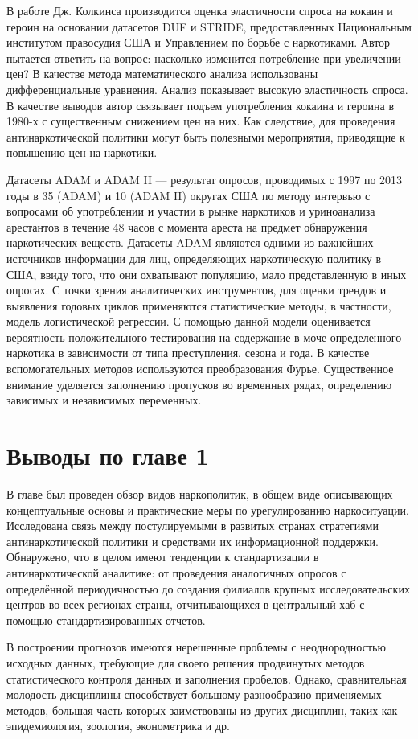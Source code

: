 В работе Дж. Колкинса \cite{Caulkins1995} производится оценка эластичности спроса 
на кокаин и героин на основании датасетов DUF и STRIDE, предоставленных
Национальным институтом правосудия США и Управлением по борьбе с наркотиками.
Автор пытается ответить на вопрос: насколько изменится потребление при
увеличении цен? В качестве метода математического анализа использованы
дифференциальные уравнения. Анализ показывает высокую эластичность спроса. В
качестве выводов автор связывает подъем употребления кокаина и героина в 1980-х
с существенным снижением цен на них. Как следствие, для проведения
антинаркотической политики могут быть полезными мероприятия, приводящие к
повышению цен на наркотики.

Датасеты ADAM и ADAM II --- результат опросов, проводимых с 1997 по 2013 годы в
35 (ADAM) и 10 (ADAM II) округах США по методу интервью с вопросами об
употреблении и участии в рынке наркотиков и уриноанализа арестантов в течение 48
часов с момента ареста на предмет обнаружения наркотических
веществ\cite{Hunt2013, Chapman2010}. Датасеты ADAM являются одними из
важнейших источников информации для лиц, определяющих наркотическую политику в
США, ввиду того, что они охватывают популяцию, мало представленную в иных
опросах. С точки зрения аналитических инструментов, для оценки трендов и
выявления годовых циклов применяются статистические методы, в частности, модель
логистической регрессии.  С помощью данной модели оценивается вероятность
положительного тестирования на содержание в моче определенного наркотика в
зависимости от типа преступления, сезона и года. В качестве вспомогательных
методов используются преобразования Фурье. Существенное внимание уделяется
заполнению пропусков во временных рядах, определению зависимых и независимых
переменных.

\newpage
\section*{Выводы по главе 1}

В главе был проведен обзор видов наркополитик, в общем виде описывающих
концептуальные основы и практические меры по урегулированию наркоситуации.
Исследована связь между постулируемыми в развитых странах стратегиями
антинаркотической политики и средствами их информационной поддержки. Обнаружено,
что в целом имеют тенденции к стандартизации в антинаркотической аналитике: от
проведения аналогичных опросов с определённой периодичностью до создания
филиалов крупных исследовательских центров во всех регионах страны,
отчитывающихся в центральный хаб с помощью стандартизированных отчетов.

В построении прогнозов имеются нерешенные проблемы с неоднородностью исходных
данных, требующие для своего решения продвинутых методов статистического
контроля данных и заполнения пробелов. Однако, сравнительная молодость
дисциплины способствует большому разнообразию применяемых методов, большая часть
которых заимствованы из других дисциплин, таких как эпидемиология, зоология,
эконометрика и др.

